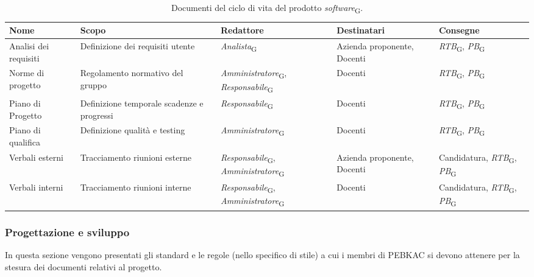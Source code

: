 \begin{table}[H]
    \centering
   \begin{tabularx}{\textwidth}{X|X|>{\hsize=1.2\hsize}X|X|>{\hsize=0.8\hsize}X}
        \textbf{Nome} & \textbf{Scopo} & \textbf{Redattore} & \textbf{Destinatari} & \textbf{Consegne} \\ \hline
        Analisi dei requisiti    & Definizione dei requisiti utente    & \textit{Analista}\textsubscript{G} & Azienda proponente, Docenti & \textit{RTB}\textsubscript{G}, \textit{PB}\textsubscript{G}    \\ \hline
        Norme di progetto    & Regolamento normativo del gruppo    & \textit{Amministratore}\textsubscript{G}, \textit{Responsabile}\textsubscript{G} &  Docenti & \textit{RTB}\textsubscript{G}, \textit{PB}\textsubscript{G}   \\ \hline
        Piano di Progetto   & Definizione temporale scadenze e progressi    & \textit{Responsabile}\textsubscript{G} &  Docenti & \textit{RTB}\textsubscript{G}, \textit{PB}\textsubscript{G}   \\ \hline
        Piano di qualifica   & Definizione qualità e testing    & \textit{Amministratore}\textsubscript{G} &  Docenti & \textit{RTB}\textsubscript{G}, \textit{PB}\textsubscript{G}   \\ \hline
         Verbali esterni   & Tracciamento riunioni esterne   & \textit{Responsabile}\textsubscript{G}, \textit{Amministratore}\textsubscript{G} &  Azienda proponente, Docenti & Candidatura, \textit{RTB}\textsubscript{G}, \textit{PB}\textsubscript{G}   \\ \hline
         Verbali interni   & Tracciamento riunioni interne   & \textit{Responsabile}\textsubscript{G}, \textit{Amministratore}\textsubscript{G} &  Docenti & Candidatura, \textit{RTB}\textsubscript{G}, \textit{PB}\textsubscript{G}  
       
    \end{tabularx}
    \caption{Documenti del ciclo di vita del prodotto \textit{software}\textsubscript{G}.}
\end{table}


\subsubsection{Progettazione e sviluppo}
In questa sezione vengono presentati gli standard e le regole (nello specifico di stile) a cui i membri di PEBKAC si devono attenere per la stesura dei documenti relativi al progetto.

